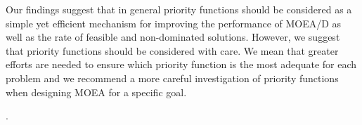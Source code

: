 Our findings suggest that in general priority functions should be considered as a simple yet efficient mechanism for improving the performance of MOEA/D as well as the rate of feasible and non-dominated solutions. However, we suggest that priority functions should be considered with care. We mean that greater efforts are needed to ensure which priority function is the most adequate for each problem and we recommend a more careful investigation of priority functions when designing MOEA for a specific goal.

. 

%



%

